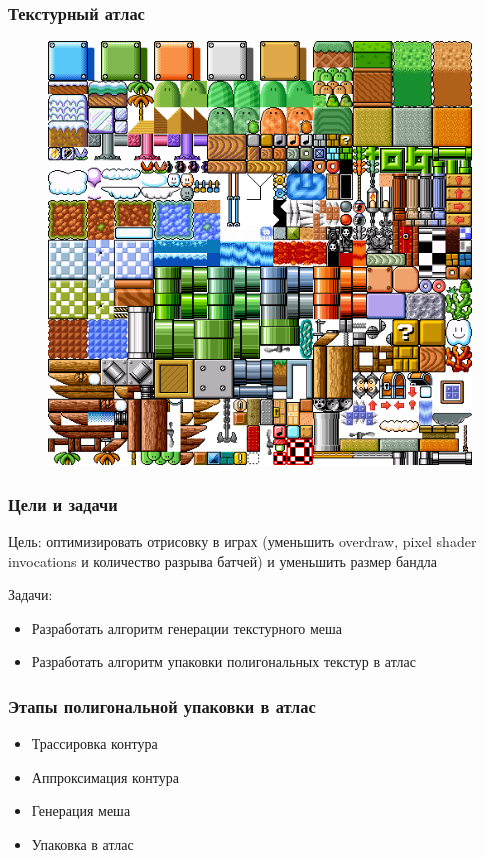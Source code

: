 \documentclass[10pt, unicode]{beamer}
\begin{document}
    \begin{frame}
        \frametitle{Текстурный атлас}
        \begin{figure}[H]
            \centering
            \includegraphics[scale=0.2]{texture_atlas_example.png}
        \end{figure}
    \end{frame}
    \begin{frame}
        \frametitle{Цели и задачи}
        Цель: оптимизировать отрисовку в играх (уменьшить overdraw, pixel shader invocations и количество разрыва батчей) и уменьшить размер бандла

        Задачи:
        \begin{itemize}
            \item Разработать алгоритм генерации текстурного меша
            \item Разработать алгоритм упаковки полигональных текстур в атлас
        \end{itemize}
    \end{frame}
    \begin{frame}
        \frametitle{Этапы полигональной упаковки в атлас}
        \begin{itemize}
            \item Трассировка контура
            \item Аппроксимация контура
            \item Генерация меша
            \item Упаковка в атлас
        \end{itemize}
    \end{frame}
\end{document}
